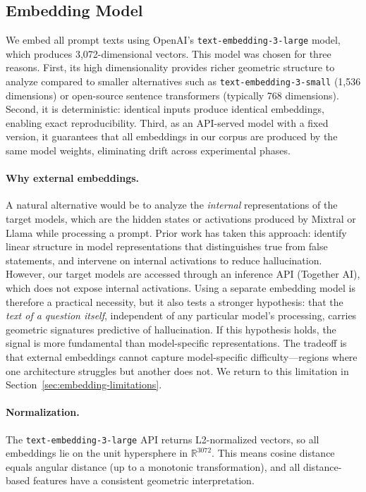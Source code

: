 \subsection{Embedding Model}
\label{sec:embedding-model}

We embed all prompt texts using OpenAI's \texttt{text-embedding-3-large} model, which produces 3,072-dimensional vectors. This model was chosen for three reasons. First, its high dimensionality provides richer geometric structure to analyze compared to smaller alternatives such as \texttt{text-embedding-3-small} (1,536 dimensions) or open-source sentence transformers (typically 768 dimensions). Second, it is deterministic: identical inputs produce identical embeddings, enabling exact reproducibility. Third, as an API-served model with a fixed version, it guarantees that all embeddings in our corpus are produced by the same model weights, eliminating drift across experimental phases.

\paragraph{Why external embeddings.} A natural alternative would be to analyze the \emph{internal} representations of the target models, which are the hidden states or activations produced by Mixtral or Llama while processing a prompt. Prior work has taken this approach: \citet{marks2023geometry} identify linear structure in model representations that distinguishes true from false statements, and \citet{li2024inferencetime} intervene on internal activations to reduce hallucination. However, our target models are accessed through an inference API (Together AI), which does not expose internal activations. Using a separate embedding model is therefore a practical necessity, but it also tests a stronger hypothesis: that the \emph{text of a question itself}, independent of any particular model's processing, carries geometric signatures predictive of hallucination. If this hypothesis holds, the signal is more fundamental than model-specific representations. The tradeoff is that external embeddings cannot capture model-specific difficulty---regions where one architecture struggles but another does not. We return to this limitation in Section~\ref{sec:embedding-limitations}.

\paragraph{Normalization.} The \texttt{text-embedding-3-large} API returns L2-normalized vectors, so all embeddings lie on the unit hypersphere in $\mathbb{R}^{3072}$. This means cosine distance equals angular distance (up to a monotonic transformation), and all distance-based features have a consistent geometric interpretation.

